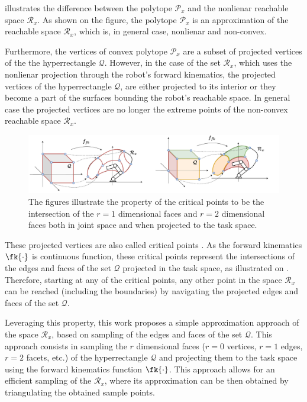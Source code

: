  illustrates the difference between the polytope $\mathcal{P}_x$ and the nonlienar reachable space $\mathcal{R}_x$. As shown on the figure, the polytope $\mathcal{P}_x$ is an approximation of the reachable space $\mathcal{R}_x$, which is, in general case, nonlienar and non-convex. 

Furthermore, the vertices of convex polytope $\mathcal{P}_x$ are a subset of projected vertices of the the hyperrectangle $\mathcal{Q}$. However, in the case of the set $\mathcal{R}_x$, which uses the nonlienar projection through the robot's forward kinematics, the projected vertices of the hyperrectangle $\mathcal{Q}$, are either projected to its interior or they become a part of the surfaces bounding the robot's reachable space. In general case the projected vertices are no longer the extreme points of the non-convex reachable space $\mathcal{R}_x$. 

\begin{figure}[!h]
    \centering
    \includegraphics[width=\textwidth]{Papers/images/curved_space_algo_new_critical.pdf}
    \caption{The figures illustrate the property of the critical points to be the intersection of the $r=1$ dimensional faces and $r=2$ dimensional faces both in joint space and when projected to the task space.}
    \label{fig:curved_space_algo_new_critical}
\end{figure}

These projected vertices are also called critical points \cite{MERLET1998critical}. As the forward kinematics $\fk{\cdot}$ is continuous function, these critical points represent the intersections of the edges and faces of the set $\mathcal{Q}$ projected in the task space, as illustrated on . Therefore, starting at any of the critical points, any other point in the space $\mathcal{R}_x$ can be reached (including the boundaries) by navigating the projected edges and faces of the set $\mathcal{Q}$. 


Leveraging this property, this work proposes a simple approximation approach of the space $\mathcal{R}_x$, based on sampling of the edges and faces of the set $\mathcal{Q}$.
This approach consists in sampling the $r$ dimensional faces ($r=0$ vertices, $r=1$ edges, $r=2$ facets, etc.) of the hyperrectangle $\mathcal{Q}$ and projecting them to the task space using the forward kinematics function $\fk{\cdot}$. This approach allows for an efficient sampling of the $\mathcal{R}_x$, where its approximation can be then obtained by triangulating the obtained sample points. 

